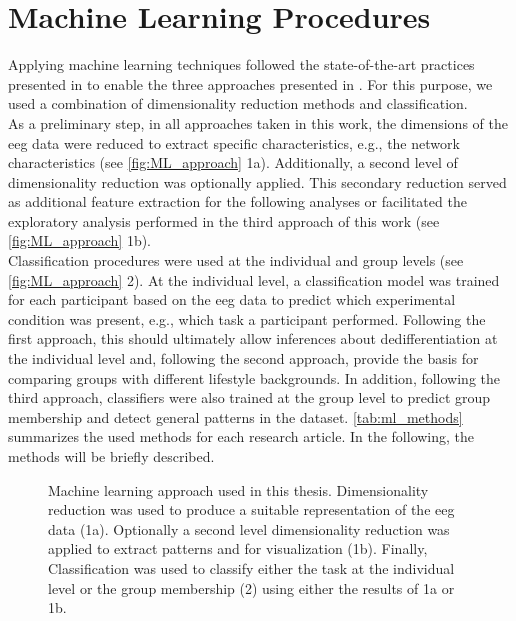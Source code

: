 \section{Machine Learning Procedures}
Applying machine learning techniques followed the state-of-the-art practices presented in  to enable the three approaches presented in . For this purpose, we used a combination of dimensionality reduction methods and classification.\\
As a preliminary step, in all approaches taken in this work, the dimensions of the \gls{eeg} data were reduced to extract specific characteristics, e.g., the network characteristics (see \autoref{fig:ML_approach} 1a). Additionally, a second level of dimensionality reduction was optionally applied. This secondary reduction served as additional feature extraction for the following analyses or facilitated the exploratory analysis performed in the third approach of this work (see \autoref{fig:ML_approach} 1b).\\
Classification procedures were used at the individual and group levels (see \autoref{fig:ML_approach} 2). At the individual level, a classification model was trained for each participant based on the \gls{eeg} data to predict which experimental condition was present, e.g., which task a participant performed. Following the first approach, this should ultimately allow inferences about dedifferentiation at the individual level and, following the second approach, provide the basis for comparing groups with different lifestyle backgrounds. In addition, following the third approach, classifiers were also trained at the group level to predict group membership and detect general patterns in the dataset. \autoref{tab:ml_methods}  summarizes the used methods for each research article. In the following, the methods will be briefly described.

\begin{figure}[ht]
\begin{center}

\caption[Machine learning approach used in this thesis]{Machine learning approach used in this thesis. Dimensionality reduction was used to produce a suitable representation of the \gls{eeg} data (1a). Optionally a second level dimensionality reduction was applied to extract patterns and for visualization (1b). Finally, Classification was used to classify either the task at the individual level or the group membership (2) using either the results of 1a or 1b.}
\label{fig:ML_approach}
\end{center}
\end{figure}


